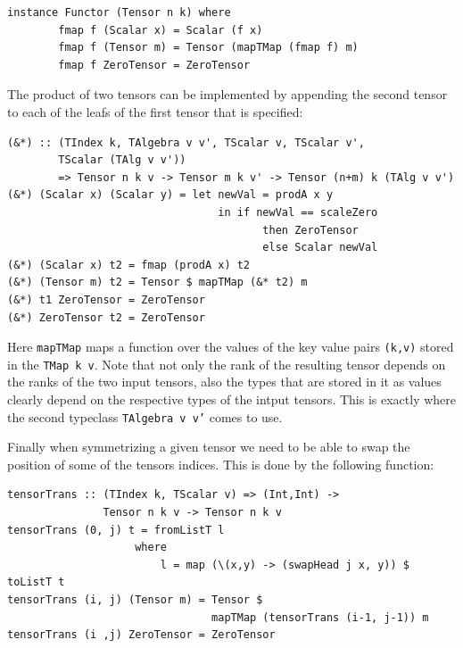 \documentclass[a4paper,12pt, DIV=14, BCOR=5mm, twoside, headsepline]{scrbook}
\begin{document}
\begin{samepage} 
\begin{verbatim}
instance Functor (Tensor n k) where 
        fmap f (Scalar x) = Scalar (f x)
        fmap f (Tensor m) = Tensor (mapTMap (fmap f) m)
        fmap f ZeroTensor = ZeroTensor 
\end{verbatim} 
\end{samepage}

The product of two tensors can be implemented by appending the second tensor to each of the leafs of the first tensor that is specified:

\begin{samepage} 
\begin{verbatim}
(&*) :: (TIndex k, TAlgebra v v', TScalar v, TScalar v',
        TScalar (TAlg v v'))
        => Tensor n k v -> Tensor m k v' -> Tensor (n+m) k (TAlg v v') 
(&*) (Scalar x) (Scalar y) = let newVal = prodA x y 
                                 in if newVal == scaleZero
                                        then ZeroTensor 
                                        else Scalar newVal 
(&*) (Scalar x) t2 = fmap (prodA x) t2 
(&*) (Tensor m) t2 = Tensor $ mapTMap (&* t2) m 
(&*) t1 ZeroTensor = ZeroTensor 
(&*) ZeroTensor t2 = ZeroTensor
\end{verbatim} 
\end{samepage}

Here \texttt{mapTMap} maps a function over the values of the key value pairs \texttt{(k,v)} stored in the \texttt{TMap k v}.
Note that not only the rank of the resulting tensor depends on the ranks of the two input tensors, also the types that are stored in it as values clearly depend on the respective types of the intput tensors. This is exactly where the second typeclass \texttt{TAlgebra v v'} comes to use. 

Finally when symmetrizing a given tensor we need to be able to swap the position of some of the tensors indices. This is done by the following function:

\begin{samepage} 
\begin{verbatim}
tensorTrans :: (TIndex k, TScalar v) => (Int,Int) ->
               Tensor n k v -> Tensor n k v
tensorTrans (0, j) t = fromListT l
                    where 
                        l = map (\(x,y) -> (swapHead j x, y)) $ toListT t
tensorTrans (i, j) (Tensor m) = Tensor $ 
                                mapTMap (tensorTrans (i-1, j-1)) m 
tensorTrans (i ,j) ZeroTensor = ZeroTensor
\end{verbatim} 
\end{samepage}
\end{document}
